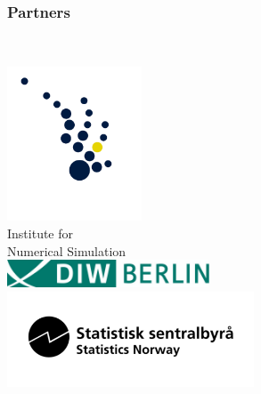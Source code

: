\begin{frame}\frametitle{Partners}\vspace{1.0cm}

\begin{columns}[t]

\centering \\  \vspace{-1.25cm}
	\includegraphics[width=0.3\textwidth]{material/crop-cooperation-ins.png} \\\vspace{-0.5cm}
		\footnotesize{Institute for \\ Numerical Simulation}\vspace{0.3cm}   \\ \vspace{0.5cm}  
	\includegraphics[width=0.45\textwidth]{material/crop-cooperation-diw.png} \\ \vspace{0.5cm}
	\includegraphics[width=0.55\textwidth]{material/crop-cooperation-ssb.png} \\
 

\end{columns}
\end{frame}
